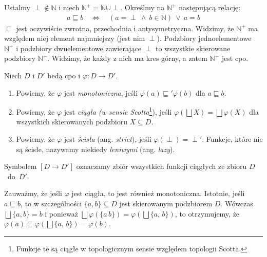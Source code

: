 \begin{przyklad}\label{ex:scott_d0}
  Ustalmy \(\perp\not\in \mathbb{N}\) i niech \(\mathbb{N}^{+}=\mathbb{N}\cup{\perp}\). Określmy na \(\mathbb{N}^+\) następującą relację:
  \begin{align*}
    a \sqsubseteq b \quad \Leftrightarrow\quad (a=\perp\ \land\ b\in \mathbb{N})\ \lor\ a = b
  \end{align*}
  \(\sqsubseteq\) jest oczywiście zwrotna, przechodnia i antysymetryczna. Widzimy, że \(\mathbb{N}^{+}\) ma względem niej element najmniejszy (jest nim  \(\perp\)). Podzbiory jednoelementowe \(\mathbb{N}^{+}\) i podzbiory dwuelementowe zawierające \(\perp\) to wszystkie skierowane podzbiory \(\mathbb{N}^{+}\). Widzimy, że każdy z nich ma kres górny, a zatem \(\mathbb{N}^{+}\) jest cpo.
\end{przyklad}

\begin{definicja}\label{def:m_cont}%
Niech \(D\) i \(D'\) bedą cpo i \(\varphi: D\to D'\).
\begin{enumerate}[label={(\alph*)}, ref={(\alph*)}] 
  \setlength\itemsep{0em}
\item Powiemy, że \(\varphi\) jest \emph{monotoniczna}, jeśli \(\varphi(a) \sqsubseteq' \varphi(b)\) dla \(a\sqsubseteq b\).
\item Powiemy, że \(\varphi\) jest \emph{ciągła (w sensie Scotta}\footnote{Funkcje te są ciągłe w topologicznym sensie względem topologii Scotta.}), jeśli \(\varphi(\bigsqcup X) = \bigsqcup \varphi (X)\) dla wszystkich skierowanych podzbioru \(X\subseteq D\).\label{def:m_cont_2}
\item Powiemy, że \(\varphi\) jest \emph{ścisła} (ang. \emph{strict}), jeśli \(\varphi(\perp)=\perp'\). Funkcje, które nie są ścisłe, nazywamy niekiedy \emph{leniwymi} (ang. \emph{lazy}).
\end{enumerate}
Symbolem \([D\to D']\) oznaczamy zbiór wszystkich funkcji ciągłych ze zbioru \(D\)~do~\(D'\).
\end{definicja}

\begin{uwaga*}
Zauważmy, że jeśli \(\varphi\) jest ciągła, to jest również monotoniczna. Istotnie, jeśli \(a\sqsubseteq b\), to w szczególności \(\{a, b\}\subseteq D\) jest skierowanym podzbiorem \(D\). Wówczas \(\bigsqcup\{a, b\}=b\) i ponieważ \(\bigsqcup \varphi(\{a\,b\})=\varphi(\bigsqcup\{a,\,b\})\), to otrzymujemy, że \(\varphi(a)\sqsubseteq \varphi(\bigsqcup\{a,\,b\}) = \varphi(b)\).
\end{uwaga*}

